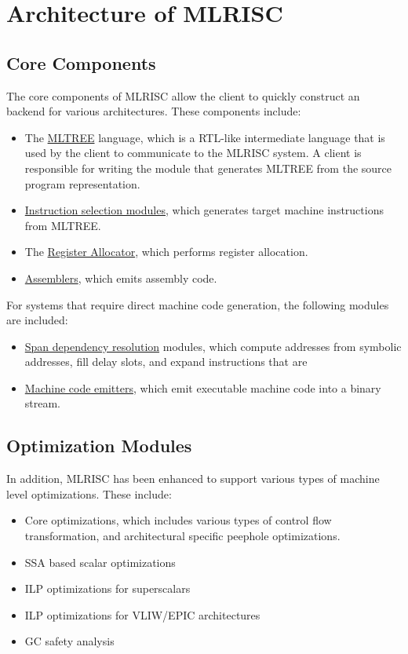 \section{Architecture of MLRISC}

\subsection{Core Components}

  The core components of MLRISC allow the client to quickly construct 
an backend for various architectures.  These components include:
\begin{itemize}
  \item The \href{mltree.html}{MLTREE} language, 
       which is a RTL-like intermediate language
       that is used by the client
       to communicate to the MLRISC system.  A client is
       responsible for writing the module that generates MLTREE from
       the source program representation.
  \item \href{instrsel.html}{Instruction selection modules}, 
      which generates target machine 
       instructions from MLTREE.
  \item The \href{ra.html}{Register Allocator},
       which performs register allocation.
  \item \href{asm.html}{Assemblers}, which emits assembly code.
\end{itemize}

For systems that require direct machine code generation, the following
modules are included:
\begin{itemize}
  \item \href{span-dep.html}{Span dependency resolution} 
       modules, which compute addresses    
       from symbolic addresses,
       fill delay slots, and expand instructions that are 
  \item \href{mc.html}{Machine code emitters}, 
        which emit executable machine code into a binary stream.
\end{itemize}

\subsection{Optimization Modules}

In addition, MLRISC has been enhanced to support various types of
machine level optimizations.  These include:

\begin{itemize}
  \item Core optimizations, which includes
       various types of control flow transformation, 
       and architectural specific peephole optimizations. 
  \item SSA based scalar optimizations
  \item ILP optimizations for superscalars
  \item ILP optimizations for VLIW/EPIC architectures
  \item GC safety analysis
\end{itemize}

